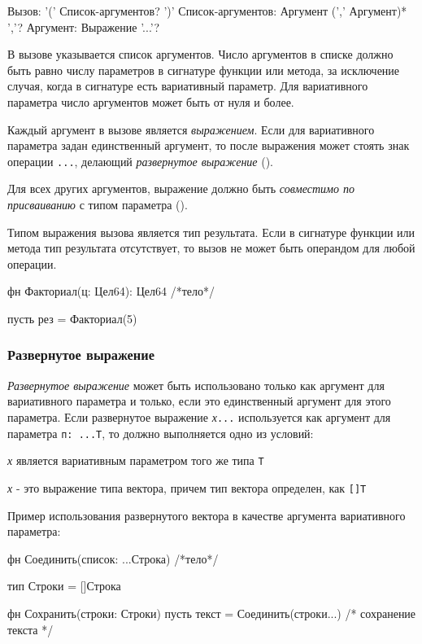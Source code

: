 \begin{Grammar}
Вызов: '(' Список-аргументов? ')'
Список-аргументов: Аргумент (',' Аргумент)* ','?
Аргумент: Выражение '...'?
\end{Grammar}   

В вызове указывается список аргументов. Число аргументов в списке должно быть равно числу параметров в сигнатуре функции или метода, за исключение случая, 
когда в сигнатуре есть вариативный параметр. Для вариативного параметра число аргументов может быть от нуля и более.

Каждый аргумент в вызове является \emph{выражением}. 
Если для вариативного параметра задан единственный аргумент, то после выражения может стоять знак операции \verb+...+, делающий  \emph{развернутое выражение} ().

Для всех других аргументов, выражение должно быть \emph{совместимо по присваиванию} с типом параметра ().

Типом выражения вызова является тип результата. Если в сигнатуре функции или метода тип результата отсутствует, то вызов не может быть операндом для любой операции.

\begin{Trivil}
фн Факториал(ц: Цел64): Цел64 { /*тело*/ }

пусть рез = Факториал(5)
\end{Trivil}

\hypertarget{call-unfold}{%
\subsubsection{Развернутое выражение}\label{expr:call-unfold}}

\emph{Развернутое выражение} может быть использовано только как аргумент для вариативного параметра и только, если это единственный аргумент для этого параметра. 
Если развернутое выражение \emph{х}\verb+...+ используется как аргумент для параметра \verb+п: ...Т+, то должно выполняется одно из условий:
\begin{d_itemize}
\item
    \emph{х} является вариативным параметром того же типа \verb+Т+
\item
    \emph{х} - это выражение типа вектора, причем тип вектора определен, как \verb+[]Т+
\end{d_itemize}

Пример использования развернутого вектора в качестве аргумента вариативного параметра:
\begin{Trivil}[vspace=2pt]
фн Соединить(список: ...Строка) {/*тело*/}

тип Строки = []Строка

фн Сохранить(строки: Строки) {
   пусть текст = Соединить(строки...)
   /* сохранение текста */
}
\end{Trivil}

